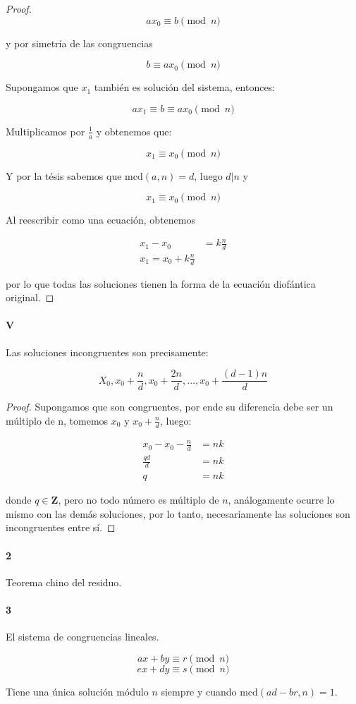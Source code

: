 \documentclass{article}
\begin{document}
\begin{proof}
$$ax_0 \equiv b \pmod{n}$$

y por simetría de las congruencias

$$b \equiv ax_0 \pmod{n}$$

Supongamos que $x_1$ también es solución del sistema, entonces:

$$ax_1 \equiv b \equiv a x_0 \pmod{n}$$

Multiplicamos por $\frac{1}{a}$ y obtenemos que:

$$x_1\equiv x_0 \pmod{n}$$

Y por la tésis sabemos que $\text{mcd}(a,n) = d$, luego $d|n$ y 

$$x_1 \equiv x_0 \pmod{n}$$

Al reescribir como una ecuación, obtenemos

\begin{align*}
    x_1 - x_0 &= k\frac{n}{d}\\
    x_1 = x_0 + k\frac{n}{d}
\end{align*}

por lo que todas las soluciones tienen la forma de la ecuación diofántica original.
\end{proof}

\paragraph{V} Las soluciones incongruentes son precisamente:

$$X_0, x_0 + \frac{n}{d}, x_0 + \frac{2n}{d}, \dots, x_0 + \frac{(d-1)n}{d}$$

\begin{proof}
Supongamos que son congruentes, por ende su diferencia debe ser un múltiplo de n, tomemos $x_0$ y $x_0 + \frac{n}{d}$, luego:

\begin{align*}
    x_0 - x_0 - \frac{n}{d} &= nk\\
    \frac{qd}{d} &= nk\\
    q &= nk
\end{align*}

donde $q \in \mathbf{Z}$, pero no todo número es múltiplo de $n$, análogamente ocurre lo mismo con las demás soluciones, por lo tanto, necesariamente las soluciones son incongruentes entre sí.
\end{proof}

\paragraph{2} Teorema chino del residuo.

\paragraph{3} El sistema de congruencias lineales.

$$ax + by \equiv r \pmod{n}$$
$$ex + dy \equiv s \pmod{n}$$

Tiene una única solución módulo $n$ siempre y cuando $\text{mcd}(ad-br,n) = 1$.
\end{document}
